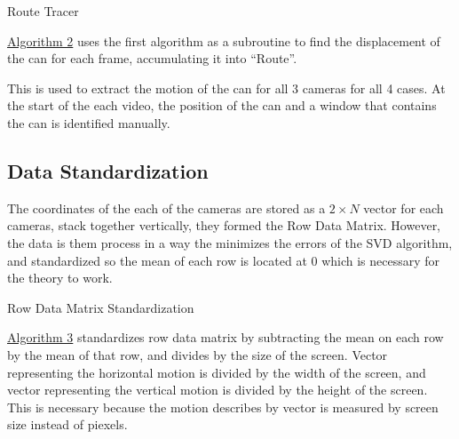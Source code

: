 \documentclass{article}
\begin{document}
        \begin{algorithm}\label{alg:algorithm2}\small
            \begin{algorithmic}[1]
                {
                }
                \ENDFOR
            \end{algorithmic}\caption{Route Tracer}
        \end{algorithm}
        \par
        \hyperref[alg:algorithm2]{Algorithm 2} uses the first algorithm as a subroutine to find the displacement of the can for each frame, accumulating it into ``Route''. 
        \par
        This is used to extract the motion of the can for all 3 cameras for all 4 cases. At the start of the each video, the position of the can and a window that contains the can is identified manually.
        
    \subsection{Data Standardization}
        \hspace{1.1em}
        The coordinates of the each of the cameras are stored as a $2\times N$ vector for each cameras, stack together vertically, they formed the Row Data Matrix. However, the data is them process in a way the minimizes the errors of the SVD algorithm, and standardized so the mean of each row is located at $0$ which is necessary for the theory to work. 
        \begin{algorithm}\label{alg:algorithm3}\small
            \begin{algorithmic}[1]
            \end{algorithmic}\caption{Row Data Matrix Standardization}
        \end{algorithm}
        \par
        \hyperref[alg:algorithm3]{Algorithm 3} standardizes row data matrix by subtracting the mean on each row by the mean of that row, and divides by the size of the screen. Vector representing the horizontal motion is divided by the width of the screen, and vector representing the vertical motion is divided by the height of the screen. This is necessary because the motion describes by vector is measured by screen size instead of piexels. 
\end{document}
